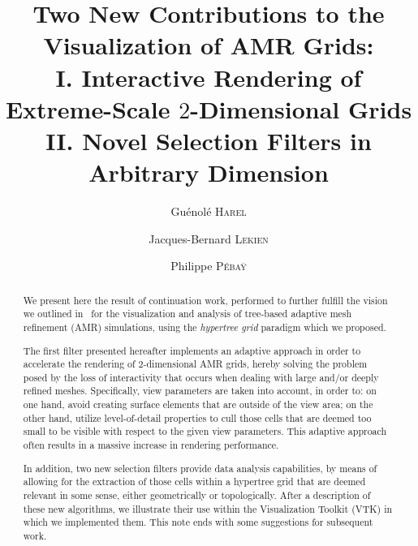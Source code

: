 \documentclass[global,twocolumn,final,numbook]{svjour}
\begin{document}
\title{Two New Contributions to the Visualization of AMR Grids:\\
       I. Interactive Rendering of Extreme-Scale $2$-Dimensional Grids\\
       II. Novel Selection Filters in Arbitrary Dimension}
\author{Gu\'enol\'e \textsc{Harel}
	\and
        Jacques-Bernard \textsc{Lekien}
	\and
	Philippe \textsc{P\'eba\"y}
}
\def\makeheadbox{} %
\maketitle
\begin{abstract}
We present here the result of continuation work, performed to further
fulfill the vision we outlined in~\cite{harel:17} for the
visualization and analysis of tree-based adaptive mesh refinement
(AMR) simulations, using the \emph{hypertree grid} paradigm which
we proposed.

The first filter presented hereafter implements an adaptive approach in
order to accelerate the rendering of $2$-dimensional AMR grids,
hereby solving the problem posed by the loss of interactivity
that occurs when dealing with large and/or deeply refined meshes.
Specifically, view parameters are taken into account, in
order to: on one hand, avoid creating surface elements that are
outside of  the view area; on the other hand, utilize level-of-detail
properties to cull those cells that are deemed too small to be visible
with respect to the given view parameters.
This adaptive approach often results in a massive increase in
rendering performance.

In addition, two new selection filters provide data analysis
capabilities, by means of allowing for the extraction of those cells
within a hypertree grid that are deemed relevant in some sense, either
geometrically or topologically.
After a description of these new algorithms, we illustrate their use
within the Visualization Toolkit (VTK) in which we implemented them.
This note ends with some suggestions for subsequent work.
\end{abstract}
\tableofcontents




\end{document}

